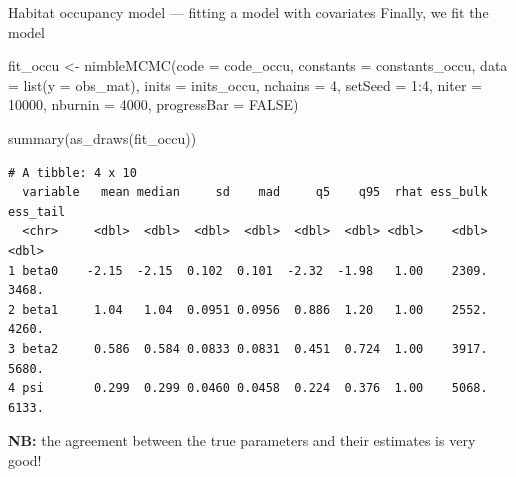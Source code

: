 \documentclass[
  10pt,
  ignorenonframetext,
  aspectratio=169,
  t]{beamer}
\newenvironment{Shaded}{\begin{snugshade}}{\end{snugshade}}
\newcommand{\AttributeTok}[1]{\textcolor[rgb]{0.40,0.45,0.13}{#1}}
\newcommand{\ConstantTok}[1]{\textcolor[rgb]{0.56,0.35,0.01}{#1}}
\newcommand{\DecValTok}[1]{\textcolor[rgb]{0.68,0.00,0.00}{#1}}
\newcommand{\FunctionTok}[1]{\textcolor[rgb]{0.28,0.35,0.67}{#1}}
\newcommand{\NormalTok}[1]{\textcolor[rgb]{0.00,0.23,0.31}{#1}}
\newcommand{\OtherTok}[1]{\textcolor[rgb]{0.00,0.23,0.31}{#1}}
\newcommand{\SpecialCharTok}[1]{\textcolor[rgb]{0.37,0.37,0.37}{#1}}
\begin{document}
\begin{frame}[fragile]{Habitat occupancy model --- fitting a model with
covariates}
\protect{}\label{habitat-occupancy-model-fitting-a-model-with-covariates-3}
Finally, we fit the model

\scriptsize

\begin{Shaded}
\begin{Highlighting}[]
\NormalTok{fit\_occu }\OtherTok{\textless{}{-}} \FunctionTok{nimbleMCMC}\NormalTok{(}\AttributeTok{code =}\NormalTok{ code\_occu,}
                       \AttributeTok{constants =}\NormalTok{ constants\_occu,}
                       \AttributeTok{data =} \FunctionTok{list}\NormalTok{(}\AttributeTok{y =}\NormalTok{ obs\_mat),}
                       \AttributeTok{inits =}\NormalTok{ inits\_occu,}
                       \AttributeTok{nchains =} \DecValTok{4}\NormalTok{, }\AttributeTok{setSeed =} \DecValTok{1}\SpecialCharTok{:}\DecValTok{4}\NormalTok{,}
                       \AttributeTok{niter =} \DecValTok{10000}\NormalTok{, }\AttributeTok{nburnin =} \DecValTok{4000}\NormalTok{,}
                       \AttributeTok{progressBar =} \ConstantTok{FALSE}\NormalTok{)}

\FunctionTok{summary}\NormalTok{(}\FunctionTok{as\_draws}\NormalTok{(fit\_occu))}
\end{Highlighting}
\end{Shaded}

\begin{verbatim}
# A tibble: 4 x 10
  variable   mean median     sd    mad     q5    q95  rhat ess_bulk ess_tail
  <chr>     <dbl>  <dbl>  <dbl>  <dbl>  <dbl>  <dbl> <dbl>    <dbl>    <dbl>
1 beta0    -2.15  -2.15  0.102  0.101  -2.32  -1.98   1.00    2309.    3468.
2 beta1     1.04   1.04  0.0951 0.0956  0.886  1.20   1.00    2552.    4260.
3 beta2     0.586  0.584 0.0833 0.0831  0.451  0.724  1.00    3917.    5680.
4 psi       0.299  0.299 0.0460 0.0458  0.224  0.376  1.00    5068.    6133.
\end{verbatim}

\normalsize

\textbf{NB:} the agreement between the true parameters and their
estimates is very good!
\end{frame}
\end{document}
